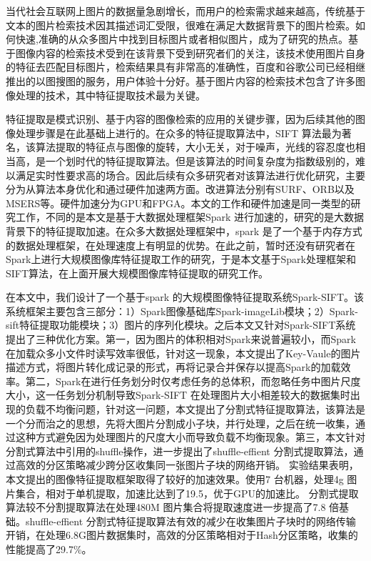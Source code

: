 ﻿\begin{cabstract}
当代社会互联网上图片的数据量急剧增长，而用户的检索需求越来越高，传统基于文本的图片检索技术因其描述词汇受限，很难在满足大数据背景下的图片检索。如何快速,准确的从众多图片中找到目标图片或者相似图片，成为了研究的热点。基于图像内容的检索技术受到在该背景下受到研究者们的关注，该技术使用图片自身的特征去匹配目标图片，检索结果具有非常高的准确性，百度和谷歌公司已经相继推出的以图搜图的服务，用户体验十分好。基于图片内容的检索技术包含了许多图像处理的技术，其中特征提取技术最为关键。

特征提取是模式识别、基于内容的图像检索的应用的关键步骤，因为后续其他的图像处理步骤是在此基础上进行的。在众多的特征提取算法中，SIFT 算法最为著名，该算法提取的特征点与图像的旋转，大小无关，对于噪声，光线的容忍度也相当高，是一个划时代的特征提取算法。但是该算法的时间复杂度为指数级别的，难以满足实时性要求高的场合。因此后续有众多研究者对该算法进行优化研究，主要分为从算法本身优化和通过硬件加速两方面。改进算法分别有SURF、ORB以及MSERS等。硬件加速分为GPU和FPGA。本文的工作和硬件加速是同一类型的研究工作，不同的是本文是基于大数据处理框架Spark 进行加速的，研究的是大数据背景下的特征提取加速。在众多大数据处理框架中，spark 是了一个基于内存方式的数据处理框架，在处理速度上有明显的优势。在此之前，暂时还没有研究者在Spark上进行大规模图像库特征提取工作的研究，于是本文基于Spark处理框架和SIFT算法，在上面开展大规模图像库特征提取的研究工作。

在本文中，我们设计了一个基于spark 的大规模图像特征提取系统Spark-SIFT。该系统框架主要包含三部分：1）Spark图像基础库Spark-imageLib模块；2）Spark-sift特征提取功能模块；3）图片的序列化模块。之后本文又针对Spark-SIFT系统提出了三种优化方案。第一，因为图片的体积相对Spark来说普遍较小，而Spark在加载众多小文件时读写效率很低，针对这一现象，本文提出了Key-Vaule的图片描述方式，将图片转化成记录的形式，再将记录合并保存以提高Spark的加载效率。第二，Spark在进行任务划分时仅考虑任务的总体积，而忽略任务中图片尺度大小，这一任务划分机制导致Spark-SIFT 在处理图片大小相差较大的数据集时出现的负载不均衡问题，针对这一问题，本文提出了分割式特征提取算法，该算法是一个分而治之的思想，先将大图片分割成小子块，并行处理，之后在统一收集，通过这种方式避免因为处理图片的尺度大小而导致负载不均衡现象。第三，本文针对分割式算法中引用的shuffle操作，进一步提出了shuffle-effient 分割式提取算法，通过高效的分区策略减少跨分区收集同一张图片子块的网络开销。 实验结果表明，本文提出的图像特征提取框架取得了较好的加速效果。使用7 台机器，处理4g 图片集合，相对于单机提取，加速比达到了19.5，优于GPU的加速比。 分割式提取算法较不分割提取算法在处理480M 图片集合将提取速度进一步提高了7.8 倍基础。shuffle-effient 分割式特征提取算法有效的减少在收集图片子块时的网络传输开销，在处理6.8G图片数据集时，高效的分区策略相对于Hash分区策略，收集的性能提高了29.7\%。
\end{cabstract}

